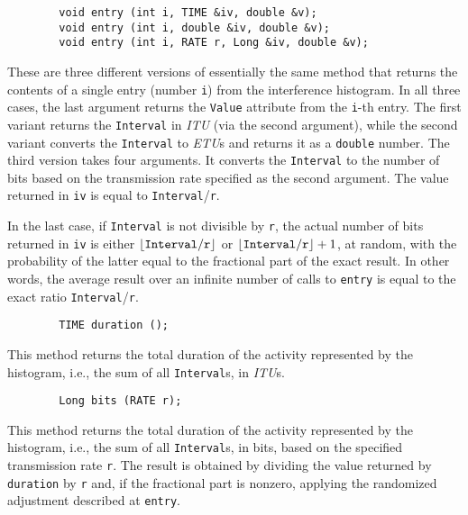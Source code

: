 \begin{verbatim}
        void entry (int i, TIME &iv, double &v);
        void entry (int i, double &iv, double &v);
        void entry (int i, RATE r, Long &iv, double &v);
\end{verbatim}
\noindent
These are three different versions of essentially the same
method that returns the contents of
a single entry (number {\tt i}) from the interference histogram.
In all three cases, the last argument returns the {\tt Value} attribute from
the {\tt i}-th entry.
The first variant returns the {\tt Interval} in {\em ITU\/} (via the
second argument), while the second variant converts the {\tt Interval} to
{\em ETU\/}s and returns it as a {\tt double} number.
The third version takes four arguments.
It converts the {\tt Interval} to the number of bits based on the transmission
rate specified as the second argument.
The value returned in {\tt iv} is equal to {\tt Interval}/{\tt r}.

In the last case,
if {\tt Interval} is not divisible by {\tt r}, the actual number of bits
returned in {\tt iv} is either
$\lfloor {\tt Interval}/{\tt r} \rfloor$ or
$\lfloor {\tt Interval}/{\tt r} \rfloor + 1$,
at random, with the probability of the latter
equal to the fractional part of the exact result.
In other words, the average result over an infinite number of calls to
{\tt entry} is equal to the exact ratio {\tt Interval}/{\tt r}.

\begin{verbatim}
        TIME duration ();
\end{verbatim}
\noindent
This method returns the total duration of the activity represented by the
histogram, i.e., the sum of all {\tt Interval}s, in {\em ITU\/}s.

\begin{verbatim}
        Long bits (RATE r);
\end{verbatim}
\noindent
This method returns the total duration of the activity represented by the
histogram, i.e., the sum of all {\tt Interval}s, in bits, based on the specified
transmission rate {\tt r}.
The result is obtained by dividing the value returned by {\tt duration} by
{\tt r} and, if the fractional part is nonzero, applying
the randomized adjustment described at {\tt entry}.

